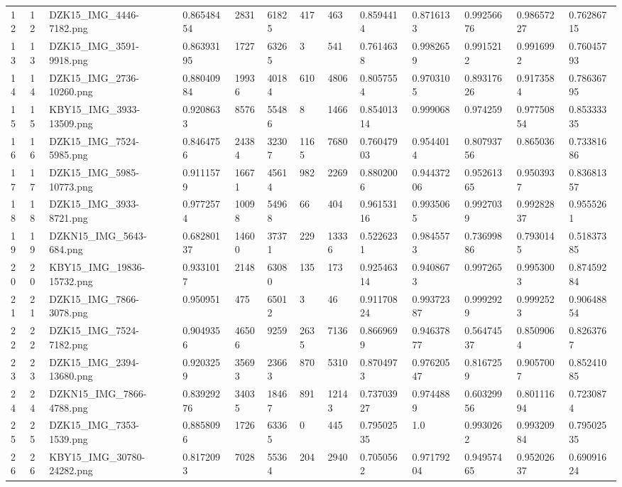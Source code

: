 \documentclass[11pt, a4paper, twoside]{report}
\begin{document}
\begin{longtable}[c]{@{}lllllllllllll@{}}
12 & 12 & DZK15\_IMG\_4446-7182.png & 0.86548454 & 2831 & 61825 & 417 & 463 & 0.8594414 & 0.8716133 & 0.99256676 & 0.98657227 & 0.76286715 \\
13 & 13 & DZK15\_IMG\_3591-9918.png & 0.86393195 & 1727 & 63265 & 3 & 541 & 0.7614638 & 0.9982659 & 0.9915212 & 0.9916992 & 0.76045793 \\
14 & 14 & DZK15\_IMG\_2736-10260.png & 0.88040984 & 19936 & 40184 & 610 & 4806 & 0.8057554 & 0.9703105 & 0.89317626 & 0.9173584 & 0.78636795 \\
15 & 15 & KBY15\_IMG\_3933-13509.png & 0.9208633 & 8576 & 55486 & 8 & 1466 & 0.85401314 & 0.999068 & 0.974259 & 0.97750854 & 0.85333335 \\
16 & 16 & DZK15\_IMG\_7524-5985.png & 0.8464756 & 24384 & 32307 & 1165 & 7680 & 0.76047903 & 0.9544014 & 0.80793756 & 0.865036 & 0.73381686 \\
17 & 17 & DZK15\_IMG\_5985-10773.png & 0.9111579 & 16671 & 45614 & 982 & 2269 & 0.8802006 & 0.94437206 & 0.95261365 & 0.9503937 & 0.83681357 \\
18 & 18 & DZK15\_IMG\_3933-8721.png & 0.9772574 & 10098 & 54968 & 66 & 404 & 0.96153116 & 0.9935065 & 0.9927039 & 0.99282837 & 0.9555261 \\
19 & 19 & DZKN15\_IMG\_5643-684.png & 0.68280137 & 14600 & 37371 & 229 & 13336 & 0.5226231 & 0.9845573 & 0.73699886 & 0.7930145 & 0.51837385 \\
20 & 20 & KBY15\_IMG\_19836-15732.png & 0.9331017 & 2148 & 63080 & 135 & 173 & 0.92546314 & 0.9408673 & 0.997265 & 0.9953003 & 0.87459284 \\
21 & 21 & DZK15\_IMG\_7866-3078.png & 0.950951 & 475 & 65012 & 3 & 46 & 0.91170824 & 0.99372387 & 0.9992929 & 0.9992523 & 0.90648854 \\
22 & 22 & DZK15\_IMG\_7524-7182.png & 0.9049356 & 46506 & 9259 & 2635 & 7136 & 0.8669699 & 0.94637877 & 0.56474537 & 0.8509064 & 0.8263767 \\
23 & 23 & DZK15\_IMG\_2394-13680.png & 0.9203259 & 35693 & 23663 & 870 & 5310 & 0.8704973 & 0.97620547 & 0.8167259 & 0.9057007 & 0.85241085 \\
24 & 24 & DZKN15\_IMG\_7866-4788.png & 0.83929276 & 34035 & 18467 & 891 & 12143 & 0.73703927 & 0.9744889 & 0.60329956 & 0.80111694 & 0.7230874 \\
25 & 25 & DZK15\_IMG\_7353-1539.png & 0.8858096 & 1726 & 63365 & 0 & 445 & 0.79502535 & 1.0 & 0.9930262 & 0.99320984 & 0.79502535 \\
26 & 26 & KBY15\_IMG\_30780-24282.png & 0.8172093 & 7028 & 55364 & 204 & 2940 & 0.7050562 & 0.97179204 & 0.94957465 & 0.95202637 & 0.69091624 \\

\end{longtable}
\end{document}
